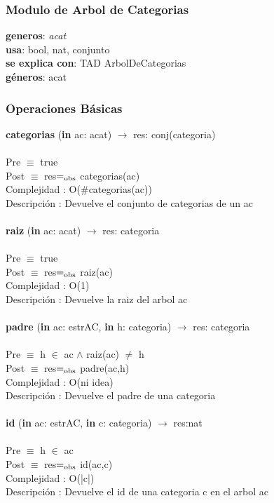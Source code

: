 \documentclass[10pt, a4paper]{article}
\begin{document}
\subsubsection{\Large Modulo de Arbol de Categorias\\}
	\textbf{generos}: \textit{acat}\\
	\textbf{usa}: bool, nat, conjunto\\
		\textbf{se explica con}: TAD ArbolDeCategorias\\
		\textbf{g\'eneros}: acat\\

\subsubsection{\Large Operaciones B\'asicas}
	\textbf{categorias} (\textbf{in} ac: acat) $\longrightarrow$ res: conj(categoria)\\\\
	Pre $\equiv$ {true}\\
	Post $\equiv$ {res$=_{\mathrm{obs}}$ categorias(ac)}\\
	Complejidad : O($\#$categorias(ac))\\
	Descripci\'{o}n : Devuelve el conjunto de categorias de un ac\\\\
	
	\textbf{raiz} (\textbf{in} ac: acat) $\longrightarrow$ res: categoria\\\\
	Pre $\equiv$ {true}\\
	Post $\equiv$ {res$=_{\mathrm{obs}}$ raiz(ac)}\\
	Complejidad : O(1)\\
	Descripci\'{o}n : Devuelve la raiz del arbol ac\\\\
	
	\textbf{padre} (\textbf{in} ac: estrAC, \textbf{in} h: categoria) $\longrightarrow$ res: categoria\\\\
	Pre $\equiv$ {h $\in$ ac $\wedge$ raiz(ac) $\neq$ h}\\
	Post $\equiv$ {res$=_{\mathrm{obs}}$ padre(ac,h)}\\
	Complejidad : O(ni idea)\\
	Descripci\'{o}n : Devuelve el padre de una categoria\\\\
		
	\textbf{id} (\textbf{in} ac: estrAC, \textbf{in} c: categoria) $\longrightarrow$ res:nat\\\\
	Pre $\equiv$ {h $\in$ ac}\\
	Post $\equiv$ {res$=_{\mathrm{obs}}$ id(ac,c)}\\
	Complejidad : O(|c|)\\
	Descripci\'{o}n : Devuelve el id de una categoria c en el arbol ac\\\\	
	
\end{document}
